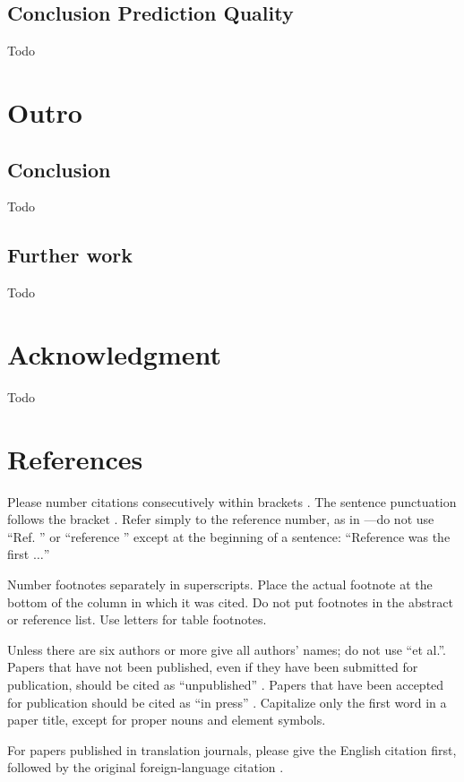 \documentclass[conference]{IEEEtran}
\begin{document}
\subsection{Conclusion Prediction Quality}
Todo


\section{Outro}

\subsection{Conclusion}
Todo

\subsection{Further work}
Todo


\section*{Acknowledgment}
Todo

\section*{References}

Please number citations consecutively within brackets \cite{b1}. The 
sentence punctuation follows the bracket \cite{b2}. Refer simply to the reference 
number, as in \cite{b3}---do not use ``Ref. \cite{b3}'' or ``reference \cite{b3}'' except at 
the beginning of a sentence: ``Reference \cite{b3} was the first $\ldots$''

Number footnotes separately in superscripts. Place the actual footnote at 
the bottom of the column in which it was cited. Do not put footnotes in the 
abstract or reference list. Use letters for table footnotes.

Unless there are six authors or more give all authors' names; do not use 
``et al.''. Papers that have not been published, even if they have been 
submitted for publication, should be cited as ``unpublished'' \cite{b4}. Papers 
that have been accepted for publication should be cited as ``in press'' \cite{b5}. 
Capitalize only the first word in a paper title, except for proper nouns and 
element symbols.

For papers published in translation journals, please give the English 
citation first, followed by the original foreign-language citation \cite{b6}.
\end{document}
